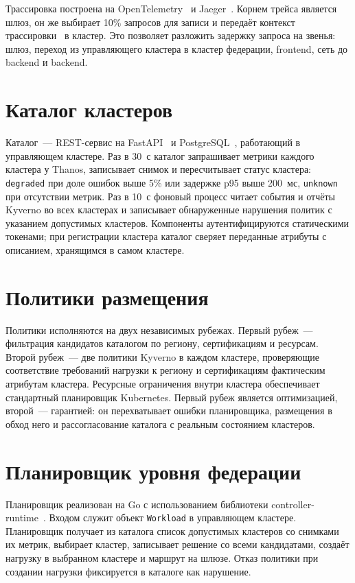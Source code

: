 Трассировка построена на OpenTelemetry~\cite{otel} и Jaeger~\cite{jaeger}.
Корнем трейса является шлюз, он же выбирает 10\% запросов для записи и
передаёт контекст трассировки~\cite{trace-context} в кластер. Это позволяет
разложить задержку запроса на звенья: шлюз, переход из управляющего кластера
в кластер федерации, frontend, сеть до backend и backend.

\section{Каталог кластеров}

Каталог~--- REST-сервис на FastAPI~\cite{fastapi} и
PostgreSQL~\cite{postgresql}, работающий в управляющем кластере. Раз в 30~с
каталог запрашивает метрики каждого кластера у Thanos, записывает снимок и
пересчитывает статус кластера: \texttt{degraded} при доле ошибок выше 5\% или
задержке p95 выше 200~мс, \texttt{unknown} при отсутствии метрик. Раз в 10~с
фоновый процесс читает события и отчёты Kyverno во всех кластерах и
записывает обнаруженные нарушения политик с указанием допустимых кластеров.
Компоненты аутентифицируются статическими токенами; при регистрации
кластера каталог сверяет переданные атрибуты с описанием, хранящимся в
самом кластере.

\section{Политики размещения}

Политики исполняются на двух независимых рубежах. Первый рубеж~--- фильтрация
кандидатов каталогом по региону, сертификациям и ресурсам. Второй рубеж~---
две политики Kyverno в каждом кластере, проверяющие соответствие требований
нагрузки к региону и сертификациям фактическим атрибутам кластера.
Ресурсные ограничения внутри кластера обеспечивает стандартный планировщик
Kubernetes. Первый рубеж является оптимизацией, второй~--- гарантией: он
перехватывает ошибки планировщика, размещения в обход него и рассогласование
каталога с реальным состоянием кластеров.

\section{Планировщик уровня федерации}
\label{sec:scheduler}

Планировщик реализован на Go с использованием библиотеки
controller-runtime~\cite{controller-runtime}. Входом служит объект
\texttt{Workload} в управляющем кластере. Планировщик получает из каталога
список допустимых кластеров со снимками их метрик, выбирает кластер,
записывает решение со всеми кандидатами, создаёт нагрузку в выбранном кластере
и маршрут на шлюзе. Отказ политики при создании нагрузки фиксируется в
каталоге как нарушение.

